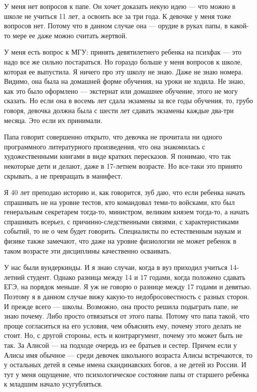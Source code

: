 У меня нет вопросов к папе. Он хочет доказать некую идею --- что можно в школе не учиться 11 лет, а освоить все за три года. К девочке у меня тоже вопросов нет. Потому что в данном случае она --- орудие в руках папы, в какой-то мере ее даже можно считать жертвой.

У меня есть вопрос к МГУ: принять девятилетнего ребенка на психфак --- это надо все же сильно постараться.  Но гораздо больше у меня вопросов к школе,  которая ее  выпустила. Я ничего про эту школу не знаю. Даже не знаю номера. Видимо, она была на домашней форме обучения, на уроки не ходила. Не знаю, как это было оформлено --- экстернат или домашнее обучение, этого не могу сказать. Но если она в восемь лет сдала экзамены за все годы обучения, то, грубо говоря, девочка должна была с шести лет сдавать экзамены каждые два-три месяца. Это если их принимали.

Папа говорит совершенно открыто, что девочка не прочитала ни одного программного литературного произведения, что она знакомилась с художественными книгами в виде кратких пересказов. Я понимаю, что так некоторые дети и делают, даже в 17-летнем возрасте. Но все-таки это принято скрывать, а не превращать в манифест.

Я 40 лет преподаю историю и, как говорится, зуб даю, что если ребенка начать спрашивать не на уровне тестов, кто командовал теми-то войсками, кто был генеральным секретарем тогда-то, министром, великим князем тогда-то, а начать спрашивать всерьез, с причинно-следственными связями, с характеристиками событий, то не о чем будет говорить. Специалисты по естественным наукам и физике также замечают, что даже на уровне физиологии не может ребенок в таком возрасте эти дисциплины качественно осваивать.

У нас были вундеркинды. И я знаю случаи, когда в вуз приходил учиться 14-летний студент. Однако разница между 14 и 17 годами, когда положено сдавать ЕГЭ, на порядок меньше. Я уж не говорю о разнице между 17 годами и девятью. Поэтому я в данном случае вижу какую-то недобросовестность с разных сторон. И прежде всего --- школы. Возможно, она просто решила подыграть папе, не знаю почему. Либо просто отвязаться от этого папы. Потому что папа такой, что проще согласиться на его условия, чем объяснять ему, почему этого делать не стоит. Но, с другой стороны, есть и контраргумент, почему это может быть не так. За Алисой --- на подходе очередь из ее братьев и сестер. Причем если у Алисы имя обычное --- среди девочек школьного возраста Алисы встречаются, то у остальных детей в семье имена скандинавских богов, а не детей из России. И тут у меня ощущение, что психологическое состояние папы от старшего ребенка к младшим начало усугубляться.

